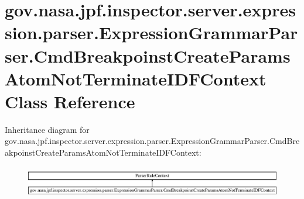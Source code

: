 \hypertarget{classgov_1_1nasa_1_1jpf_1_1inspector_1_1server_1_1expression_1_1parser_1_1_expression_grammar_paee196826319d0ea00470866a7ffd8d7b}{}\section{gov.\+nasa.\+jpf.\+inspector.\+server.\+expression.\+parser.\+Expression\+Grammar\+Parser.\+Cmd\+Breakpoinst\+Create\+Params\+Atom\+Not\+Terminate\+I\+D\+F\+Context Class Reference}
\label{classgov_1_1nasa_1_1jpf_1_1inspector_1_1server_1_1expression_1_1parser_1_1_expression_grammar_paee196826319d0ea00470866a7ffd8d7b}
Inheritance diagram for gov.\+nasa.\+jpf.\+inspector.\+server.\+expression.\+parser.\+Expression\+Grammar\+Parser.\+Cmd\+Breakpoinst\+Create\+Params\+Atom\+Not\+Terminate\+I\+D\+F\+Context\+:\begin{figure}[H]
\begin{center}
\leavevmode
\includegraphics[height=1.423126cm]{classgov_1_1nasa_1_1jpf_1_1inspector_1_1server_1_1expression_1_1parser_1_1_expression_grammar_paee196826319d0ea00470866a7ffd8d7b}
\end{center}
\end{figure}

